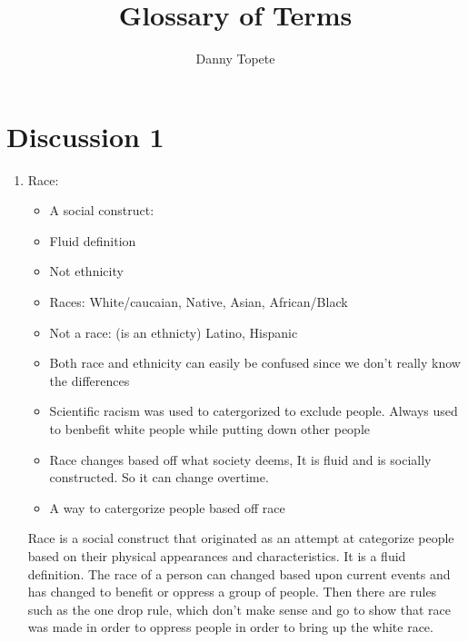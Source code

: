 \documentclass{article}
\title{Glossary of Terms}
\author{Danny Topete}
\begin{document}
  
\maketitle

\section*{Discussion 1}
\begin{enumerate}
  \item Race:
    \begin{itemize}
      \item A social construct:
      \item Fluid  definition
      \item Not ethnicity
      \item Races:
        White/caucaian, Native, Asian, African/Black
      \item Not a race: (is an ethnicty)
        Latino, Hispanic
      \item Both race and ethnicity can easily be confused since we don't 
        really know the differences
      \item Scientific racism was used to catergorized
        to exclude people.
        Always used to benbefit white people while putting
        down other people
      \item Race changes based off what society deems,
        It is fluid and is socially constructed. 
        So it can change overtime.
      \item A way to catergorize people based off race
    \end{itemize}
    Race is a social construct that originated
    as an attempt at categorize people 
    based on their physical appearances and
    characteristics. It is a fluid definition.
    The race of a person can changed based
    upon current events and has changed
    to benefit or oppress a group of people.
    Then there are rules such as the one drop rule,
    which don't make sense and go to show
    that race was made in order to oppress people
    in order to bring up the white race.


\end{enumerate}
\end{document}
